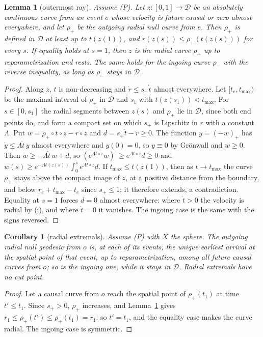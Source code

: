 \documentclass[aip,jmp,amsmath,amssymb,reprint]{revtex4-2}
\theoremstyle{plain}
\newtheorem{lemma}[proposition]{Lemma}
\newtheorem{corollary}[proposition]{Corollary}
\theoremstyle{definition}
\begin{document}
\begin{lemma}[outermost ray]\label{lem:outermost}
Assume (P). Let $z:[0,1]\to\mathcal D$ be an absolutely continuous curve from an event $e$ whose
velocity is future causal or zero almost everywhere, and let $\rho_+$ be the outgoing radial null
curve from $e$. Then $\rho_+$ is defined in $\mathcal D$ at least up to $t(z(1))$, and
$r(z(s))\le\rho_+(t(z(s)))$ for every $s$. If equality holds at $s=1$, then $z$ is the radial curve
$\rho_+$ up to reparametrization and rests. The same holds for the ingoing curve $\rho_-$ with the
reverse inequality, as long as $\rho_-$ stays in $\mathcal D$.
\end{lemma}

\begin{proof}
Along $z$, $t$ is non-decreasing and $\dot r\le s_+\dot t$ almost everywhere. Let $[t_e,t_{\max})$ be the
maximal interval of $\rho_+$ in $\mathcal D$ and $s_1$ with $t(z(s_1))<t_{\max}$. For
$s\in[0,s_1]$ the radial segments between $z(s)$ and $\rho_+$ lie in $\mathcal D$, since both end
points do, and form a compact set on which $s_+$ is Lipschitz in $r$ with a constant $\Lambda$. Put
$w=\rho_+\circ t\circ z-r\circ z$ and $d=s_+\dot t-\dot r\ge0$. The function $y=(-w)_+$ has
$\dot y\le\Lambda\dot t\,y$ almost everywhere and $y(0)=0$, so $y\equiv0$ by Gr\"onwall and $w\ge0$. Then
$\dot w\ge-\Lambda\dot t\,w+d$, so $(e^{\Lambda t\circ z}w)^\cdot\ge e^{\Lambda t\circ z}d\ge0$ and
$w(s)\ge e^{-\Lambda t(z(s))}\int_0^se^{\Lambda t\circ z}d$. If $t_{\max}\le t(z(1))$, then as $t\to t_{\max}$ the
curve $\rho_+$ stays above the compact image of $z$, at a positive distance from the boundary,
and below $r_e+t_{\max}-t_e$ since $s_+\le1$; it therefore extends, a contradiction. Equality at
$s=1$ forces $d=0$ almost everywhere: where $\dot t>0$ the velocity is radial by (i), and where
$\dot t=0$ it vanishes. The ingoing case is the same with the signs reversed.
\end{proof}

\begin{corollary}[radial extremals]\label{cor:radial}
Assume (P) with $X$ the sphere. The outgoing radial null geodesic from $o$ is, at each of its
events, the unique earliest arrival at the spatial point of that event, up to
reparametrization, among all future causal curves from $o$; so is the ingoing one, while it
stays in $\mathcal D$. Radial extremals have no cut point.
\end{corollary}

\begin{proof}
Let a causal curve from $o$ reach the spatial point of $\rho_+(t_1)$ at time $t'\le t_1$. Since
$s_+>0$, $\rho_+$ increases, and Lemma~\ref{lem:outermost} gives $r_1\le\rho_+(t')\le\rho_+(t_1)=r_1$:
so $t'=t_1$, and the equality case makes the curve radial. The ingoing case is symmetric.
\end{proof}
\end{document}
